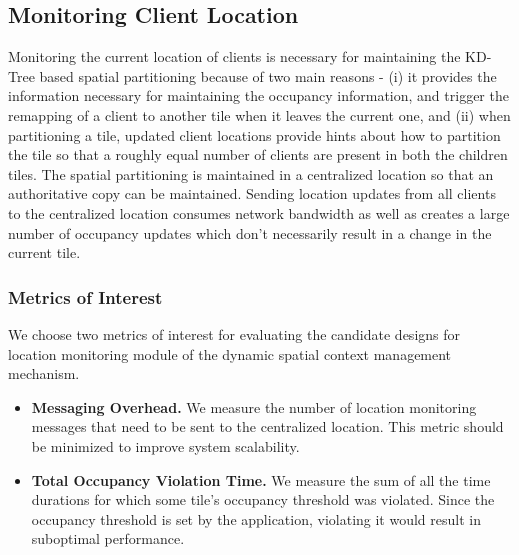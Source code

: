 \subsection{Monitoring Client Location}
Monitoring the current location of clients is necessary for maintaining the KD-Tree based spatial partitioning because of two main reasons - (i) it provides the information necessary for maintaining the occupancy information, and trigger the remapping of a client to another tile when it leaves the current one, and (ii) when partitioning a tile, updated client locations provide hints about how to partition the tile so that a roughly equal number of clients are present in both the children tiles.
The spatial partitioning is maintained in a centralized location so that an authoritative copy can be maintained. Sending location updates from all clients to the centralized location consumes network bandwidth as well as creates a large number of occupancy updates which don't necessarily result in a change in the current tile. 
\subsubsection{Metrics of Interest}
We choose two metrics of interest for evaluating the candidate designs for location monitoring module of the dynamic spatial context management mechanism. 
\begin{itemize}
\item \textbf{Messaging Overhead. } We measure the number of location monitoring messages that need to be sent to the centralized location. This metric should be minimized to improve system scalability. 
\item \textbf{Total Occupancy Violation Time. } We measure the sum of all the time durations for which some tile's occupancy threshold was violated. Since the occupancy threshold is set by the application, violating it would result in suboptimal performance.
\end{itemize}

